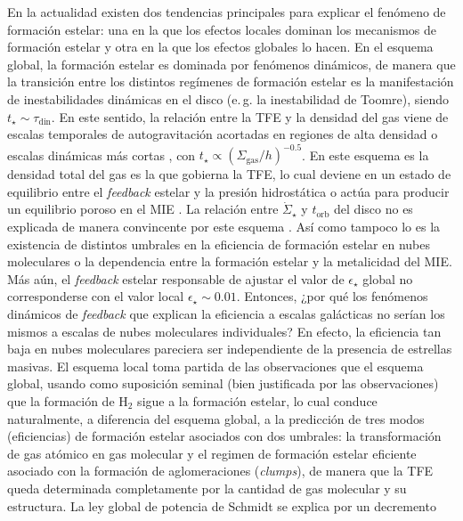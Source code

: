 \documentclass{article}
\begin{document}
\begin{description}
En la actualidad existen dos tendencias principales para explicar el fenómeno de formación estelar:
una en la que los efectos locales dominan los mecanismos de formación estelar y otra en la que los
efectos globales lo hacen. En el esquema global, la formación estelar es dominada por fenómenos
dinámicos, de manera que la transición entre los distintos regímenes de formación estelar es la
manifestación de inestabilidades dinámicas en el disco (e.\,g. la inestabilidad de Toomre), siendo
$t_\star\sim\tau_\text{din}$. En este sentido, la relación entre la TFE y la densidad del gas viene
de escalas temporales de autogravitación acortadas en regiones de alta densidad o escalas dinámicas
más cortas \citep[e.\,g.][]{Ostriker2010}, con $t_\star\propto(\Sigma_\text{gas}/h)^{-0.5}$. En este
esquema es la densidad total del gas es la que gobierna la TFE, lo cual deviene en un estado de
equilibrio entre el \emph{feedback} estelar y la presión hidrostática o actúa para producir un
equilibrio poroso en el MIE \citep{Kennicutt2012}. La relación entre $\dot{\Sigma}_\star$ y
$t_\text{orb}$ del disco no es explicada de manera convincente por este esquema
\citep{Kennicutt1998b}. Así como tampoco lo es la existencia de distintos umbrales en la eficiencia
de formación estelar en nubes moleculares o la dependencia entre la formación estelar y la
metalicidad del MIE.
Más aún, el \emph{feedback} estelar responsable de ajustar el valor de $\epsilon_\star$ global no
corresponderse con el valor local $\epsilon_\star\sim0.01$. Entonces, ¿por qué los fenómenos
dinámicos de \emph{feedback} que explican la eficiencia a escalas galácticas no serían los mismos a
escalas de nubes moleculares individuales? En efecto, la eficiencia tan baja en nubes moleculares
pareciera ser independiente de la presencia de estrellas masivas.
El esquema local toma partida de las observaciones que el esquema global, usando como suposición
seminal (bien justificada por las observaciones) que la formación de H$_2$ sigue a la formación
estelar, lo cual conduce naturalmente, a diferencia del esquema global, a la predicción de tres
modos (eficiencias) de formación estelar asociados con dos umbrales: la transformación de gas
atómico en gas molecular y el regimen de formación estelar eficiente asociado con la formación de
aglomeraciones (\emph{clumps}), de manera que la TFE queda determinada completamente por la cantidad
de gas molecular y su estructura. La ley global de potencia de Schmidt se explica por un decremento

\end{description}
\end{document}
